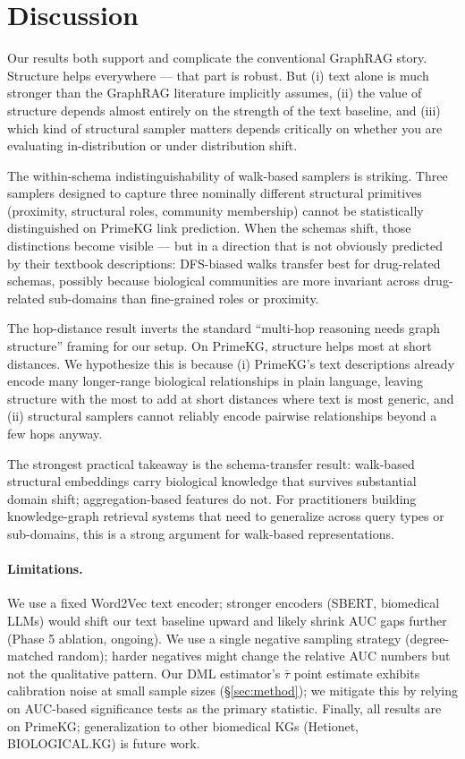 \documentclass[11pt]{article}
\begin{document}
\section{Discussion}

Our results both support and complicate the conventional GraphRAG story. Structure helps everywhere — that part is robust. But (i) text alone is much stronger than the GraphRAG literature implicitly assumes, (ii) the value of structure depends almost entirely on the strength of the text baseline, and (iii) which kind of structural sampler matters depends critically on whether you are evaluating in-distribution or under distribution shift.

The within-schema indistinguishability of walk-based samplers is striking. Three samplers designed to capture three nominally different structural primitives (proximity, structural roles, community membership) cannot be statistically distinguished on PrimeKG link prediction. When the schemas shift, those distinctions become visible — but in a direction that is not obviously predicted by their textbook descriptions: DFS-biased walks transfer best for drug-related schemas, possibly because biological communities are more invariant across drug-related sub-domains than fine-grained roles or proximity.

The hop-distance result inverts the standard ``multi-hop reasoning needs graph structure'' framing for our setup. On PrimeKG, structure helps most at short distances. We hypothesize this is because (i) PrimeKG's text descriptions already encode many longer-range biological relationships in plain language, leaving structure with the most to add at short distances where text is most generic, and (ii) structural samplers cannot reliably encode pairwise relationships beyond a few hops anyway.

The strongest practical takeaway is the schema-transfer result: walk-based structural embeddings carry biological knowledge that survives substantial domain shift; aggregation-based features do not. For practitioners building knowledge-graph retrieval systems that need to generalize across query types or sub-domains, this is a strong argument for walk-based representations.

\paragraph{Limitations.} We use a fixed Word2Vec text encoder; stronger encoders (SBERT, biomedical LLMs) would shift our text baseline upward and likely shrink AUC gaps further (Phase 5 ablation, ongoing). We use a single negative sampling strategy (degree-matched random); harder negatives might change the relative AUC numbers but not the qualitative pattern. Our DML estimator's $\bar\tau$ point estimate exhibits calibration noise at small sample sizes (\S\ref{sec:method}); we mitigate this by relying on AUC-based significance tests as the primary statistic. Finally, all results are on PrimeKG; generalization to other biomedical KGs (Hetionet, BIOLOGICAL.KG) is future work.
\end{document}
